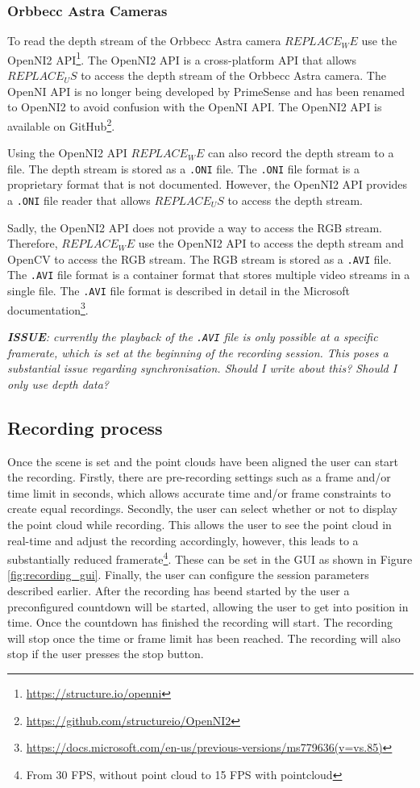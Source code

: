 \subsubsection{Orbbecc Astra Cameras}

To read the depth stream of the Orbbecc Astra camera $REPLACE_WE$ use the OpenNI2 API\footnote{\url{https://structure.io/openni}}. The OpenNI2 API is a cross-platform API that allows $REPLACE_US$ to access the depth stream of the Orbbecc Astra camera. The OpenNI API is no longer being developed by PrimeSense and has been renamed to OpenNI2 to avoid confusion with the OpenNI API. The OpenNI2 API is available on GitHub\footnote{\url{https://github.com/structureio/OpenNI2}}.

Using the OpenNI2 API $REPLACE_WE$ can also record the depth stream to a file. The depth stream is stored as a \texttt{.ONI} file. The \texttt{.ONI} file format is a proprietary format that is not documented. However, the OpenNI2 API provides a \texttt{.ONI} file reader that allows $REPLACE_US$ to access the depth stream.

Sadly, the OpenNI2 API does not provide a way to access the RGB stream. Therefore, $REPLACE_WE$ use the OpenNI2 API to access the depth stream and OpenCV to access the RGB stream. The RGB stream is stored as a \texttt{.AVI} file. The \texttt{.AVI} file format is a container format that stores multiple video streams in a single file. The \texttt{.AVI} file format is described in detail in the Microsoft documentation\footnote{\url{https://docs.microsoft.com/en-us/previous-versions/ms779636(v=vs.85)}}. 

\textit{
  \textbf{ISSUE}: currently the playback of the \texttt{.AVI} file is only possible at a specific framerate, which is set at the beginning of the recording session. This poses a substantial issue regarding synchronisation. Should I write about this? Should I only use depth data? 
}

\subsection{Recording process}

Once the scene is set and the point clouds have been aligned the user can start the recording. Firstly, there are pre-recording settings such as a frame and/or time limit in seconds, which allows accurate time and/or frame constraints to create equal recordings. Secondly, the user can select whether or not to display the point cloud while recording. This allows the user to see the point cloud in real-time and adjust the recording accordingly, however, this leads to a substantially reduced framerate\footnote{From 30 FPS, without point cloud to 15 FPS with pointcloud}. These can be set in the GUI as shown in Figure \ref{fig:recording_gui}. Finally, the user can configure the session parameters described earlier. After the recording has beend started by the user a preconfigured countdown will be started, allowing the user to get into position in time. Once the countdown has finished the recording will start. The recording will stop once the time or frame limit has been reached. The recording will also stop if the user presses the stop button.  

